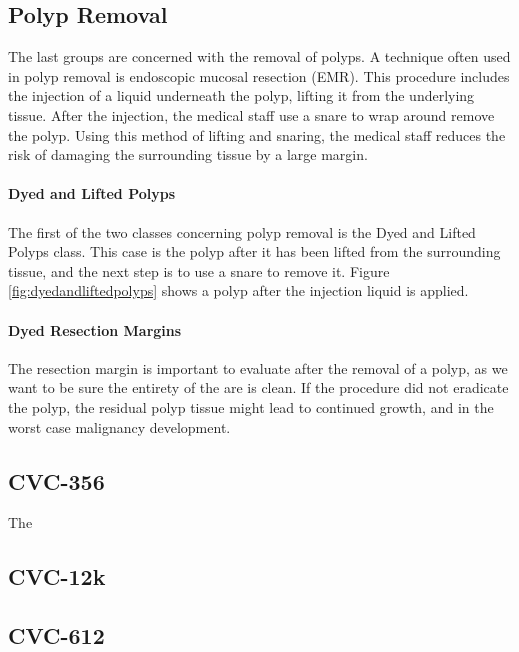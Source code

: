 \subsection{Polyp Removal}
The last groups are concerned with the removal of polyps. A technique often used in polyp removal is endoscopic mucosal resection (EMR). 
This procedure includes the injection of a liquid underneath the polyp, lifting it from the underlying tissue. After the injection, the medical staff use a snare to wrap around remove the polyp. Using this method of lifting and snaring, the medical staff reduces the risk of damaging the surrounding tissue by a large margin.

\paragraph{Dyed and Lifted Polyps}
The first of the two classes concerning polyp removal is the Dyed and Lifted Polyps class. This case is the polyp after it has been lifted from the surrounding tissue, and the next step is to use a snare to remove it.
Figure \ref{fig:dyedandliftedpolyps} shows a polyp after the injection liquid is applied. 


\paragraph{Dyed Resection Margins}
The resection margin is important to evaluate after the removal of a polyp, as we want to be sure the entirety of the are is clean. 
If the procedure did not eradicate the polyp, the residual polyp tissue might lead to continued growth, and in the worst case malignancy development. 




\subsection{CVC-356}
The 

\subsection{CVC-12k}
\subsection{CVC-612}


